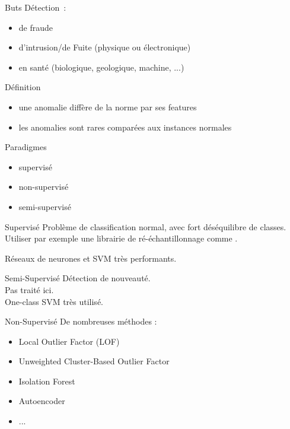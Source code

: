 \begin{frame}{Buts}
  Détection~:
  \begin{itemize}
  \item de fraude
  \item d'intrusion/de Fuite (physique ou électronique)
  \item en santé (biologique, geologique, machine, ...)
  \end{itemize}
\end{frame}

\begin{frame}{Définition}
  \begin{itemize}
  \item une anomalie diffère de la norme par ses features
  \item les anomalies sont rares comparées aux instances normales
  \end{itemize}
\end{frame}

\begin{frame}{Paradigmes}
  \begin{itemize}
    \item supervisé
    \item non-supervisé
    \item semi-supervisé
  \end{itemize}
\end{frame}

\begin{frame}{Supervisé}
  Problème de classification normal, avec fort déséquilibre de classes.
  Utiliser par exemple une librairie de ré-échantillonnage comme .

  Réseaux de neurones et SVM très performants.
\end{frame}

\begin{frame}{Semi-Supervisé}
  Détection de nouveauté. \\
  Pas traité ici. \\
  One-class SVM très utilisé.
\end{frame}

\begin{frame}{Non-Supervisé}
  De nombreuses méthodes : 
  \begin{itemize}
  \item Local Outlier Factor (LOF)
  \item Unweighted Cluster-Based Outlier Factor
  \item Isolation Forest
  \item Autoencoder
  \item ...
  \end{itemize}
\end{frame}


